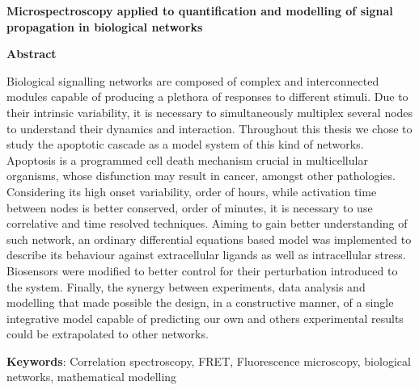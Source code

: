 \begin{center}
    {\bf \Large Microspectroscopy applied to quantification and modelling of signal propagation in biological networks\\}
    
    \vspace{4cm}
    
    
    \textbf{Abstract}
    
    Biological signalling networks are composed of complex and interconnected modules capable of producing a plethora of responses to different stimuli. Due to their intrinsic variability, it is necessary to simultaneously multiplex several nodes to understand their dynamics and interaction. Throughout this thesis we chose to study the apoptotic cascade as a model system of this kind of networks. Apoptosis is a programmed cell death mechanism crucial in multicellular organisms, whose disfunction may result in cancer, amongst other pathologies. Considering its high onset variability, order of hours, while activation time between nodes is better conserved, order of minutes, it is necessary to use correlative and time resolved techniques. Aiming to gain better understanding of such network, an ordinary differential equations based model was implemented to describe its behaviour against extracellular ligands as well as intracellular stress. Biosensors were modified to better control for their perturbation introduced to the system. Finally, the synergy between experiments, data analysis and modelling that made possible the design, in a constructive manner, of a single integrative model capable of predicting our own and others experimental results could be extrapolated to other networks.
    \vspace{2cm}
    
    
\end{center}


\textbf{Keywords}: Correlation spectroscopy, FRET, Fluorescence microscopy, biological networks, mathematical modelling